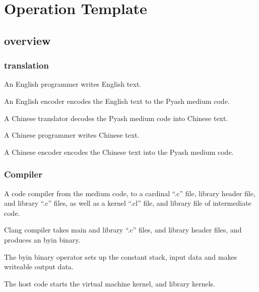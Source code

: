 \chapter{Operation Template}
\section{overview}
\subsection{translation}
An English programmer writes English text. 

An English encoder encodes the English text to the Pyash medium code. 

A Chinese translator decodes the Pyash medium code into Chinese
text.

A Chinese programmer writes Chinese text. 

A Chinese encoder encodes the Chinese text into the Pyash medium code. 

\subsection{Compiler}
A code compiler from the medium code, to a cardinal ``.c''
file, library header file, and library ``.c'' files, as well as a kernel ``.cl''
file, and library file of intermediate code.  

Clang compiler takes main and library ``.c'' files, and library header files,
and produces an byin binary.

The byin binary operator sets up the constant stack, input data and makes
writeable output data.

The host code starts the virtual machine kernel, and library kernels. 


